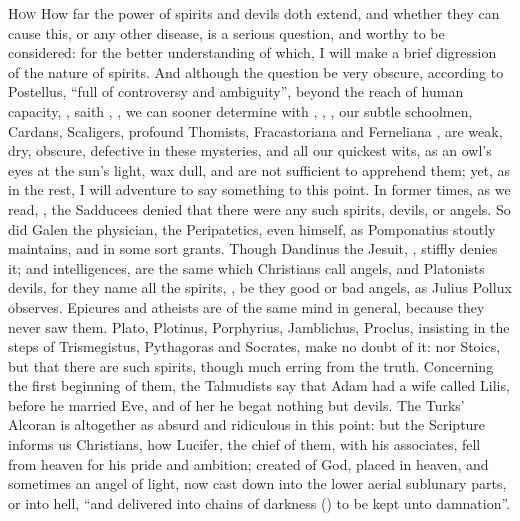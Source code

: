 \lettrine{H}{ow} How far the power of spirits and devils doth extend, and
whether they can cause this, or any other disease, is a serious question, and
worthy to be considered: for the better understanding of which, I will make a
brief digression of the nature of spirits. And although the question be very
obscure, according to Postellus, \enquote{full of controversy and
ambiguity}, beyond the reach of human capacity, , saith
\Austin{}, , we
can sooner determine with \Tully{}, ,
, our subtle schoolmen, Cardans, Scaligers,
profound Thomists, Fracastoriana and Ferneliana , are weak, dry,
obscure, defective in these mysteries, and all our quickest wits, as an owl's
eyes at the sun's light, wax dull, and are not sufficient to apprehend them;
yet, as in the rest, I will adventure to say something to this point. In former
times, as we read, , the Sadducees denied that there
were any such spirits, devils, or angels. So did Galen the physician, the
Peripatetics, even \Aristotle{} himself, as Pomponatius stoutly maintains, and
\Scaliger{} in some sort grants. Though Dandinus the Jesuit,
, stiffly denies it;
 and intelligences, are the same which Christians
call angels, and Platonists devils, for they name all the spirits,
, be they good or bad angels, as Julius Pollux
 observes. Epicures and
atheists are of the same mind in general, because they never saw them. Plato,
Plotinus, Porphyrius, Jamblichus, Proclus, insisting in the steps of
Trismegistus, Pythagoras and Socrates, make no doubt of it: nor Stoics, but
that there are such spirits, though much erring from the truth. Concerning the
first beginning of them, the Talmudists say that Adam had
a wife called Lilis, before he married Eve, and of her he begat nothing but
devils. The Turks' Alcoran is altogether as absurd and
ridiculous in this point: but the Scripture informs us Christians, how Lucifer,
the chief of them, with his associates, fell from heaven
for his pride and ambition; created of God, placed in heaven, and sometimes an
angel of light, now cast down into the lower aerial sublunary parts, or into
hell, \enquote{and delivered into chains of darkness () to
be kept unto damnation}.

